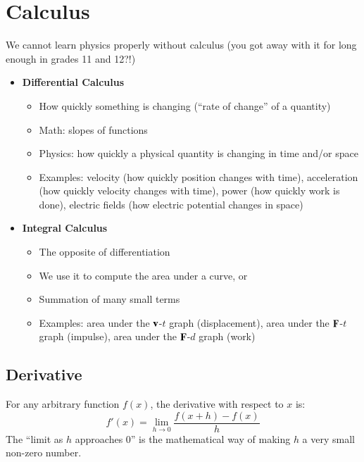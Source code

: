 \documentclass[11pt]{article}
\newcommand{\mb}[1]{\ensuremath\mathbf{#1}}
\begin{document}
\section{Calculus}
We cannot learn physics properly without calculus (you got away with it for
long enough in grades 11 and 12?!)
%
\begin{itemize}
\item\textbf{Differential Calculus}
  \begin{itemize}
  \item How quickly something is changing (``rate of change'' of a quantity)
  \item Math: slopes of functions
  \item Physics: how quickly a physical quantity is changing in time and/or
    space
  \item Examples: velocity (how quickly position changes with time),
    acceleration (how quickly velocity changes with time), power (how quickly
    work is done), electric fields (how electric potential changes in space)
  \end{itemize}
\item\textbf{Integral Calculus}
  \begin{itemize}
  \item The opposite of differentiation
  \item We use it to compute the area under a curve, or
  \item Summation of many small terms
  \item Examples: area under the $\mb{v}$-$t$ graph (displacement), area
    under the $\mb{F}$-$t$ graph (impulse), area under the $\mb{F}$-$d$ graph
    (work)
  \end{itemize}
\end{itemize}


\subsection{Derivative}

For any arbitrary function $f(x)$, the derivative with respect to $x$ is:
\begin{equation*}
  f'(x)=\lim_{h\rightarrow 0}\frac{f(x+h)-f(x)}{h}
\end{equation*}
The ``limit as $h$ approaches $0$'' is the mathematical way of making $h$ a
very small non-zero number.
\end{document}
